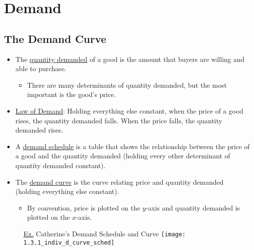 \section{Demand}

\subsection{The Demand Curve}

	\begin{itemize}

	\item The \underline{quantity demanded} of a good is the amount that buyers are willing and able to purchase.
	
		\begin{itemize}
		
		\item There are many determinants of quantity demanded, but the most important is the good's price.
		
		\end{itemize}
		
	\item \underline{Law of Demand}: Holding everything else constant, when the price of a good rises, the quantity demanded falls. When the price falls, the quantity demanded rises.
	
	\item A \underline{demand schedule} is a table that shows the relationship between the price of a good and the quantity demanded (holding every other determinant of quantity demanded constant).
	
	\item The \underline{demand curve} is the curve relating price and quantity demanded (holding everything else constant).
	
		\begin{itemize}
		
		\item By convention, price is plotted on the $y$-axis and quantity demanded is plotted on the $x$-axis.
		
		\end{itemize}

	\end{itemize}
	
	\begin{figure}[h]
	\underline{Ex.} Catherine's Demand Schedule and Curve
	\centering
	\texttt{[image: 1.3.1\_indiv\_d\_curve\_sched]}
	\end{figure}
	
